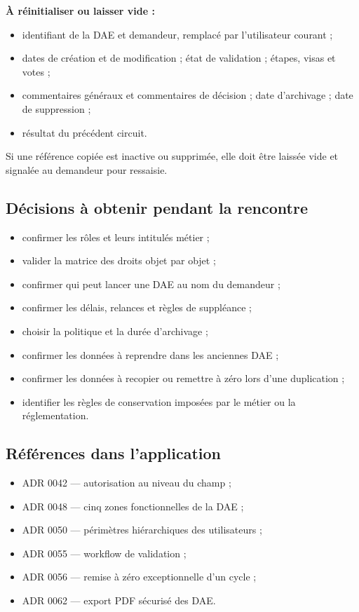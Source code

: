 \textbf{À réinitialiser ou laisser vide :}

\begin{itemize}
  \item identifiant de la DAE et demandeur, remplacé par l'utilisateur courant ;
  \item dates de création et de modification ; état de validation ; étapes, visas et votes ;
  \item commentaires généraux et commentaires de décision ; date d'archivage ; date de suppression ;
  \item résultat du précédent circuit.
\end{itemize}

Si une référence copiée est inactive ou supprimée, elle doit être laissée vide et signalée au demandeur pour ressaisie.

\subsection{Décisions à obtenir pendant la rencontre}

\begin{itemize}
  \item confirmer les rôles et leurs intitulés métier ;
  \item valider la matrice des droits objet par objet ;
  \item confirmer qui peut lancer une DAE au nom du demandeur ;
  \item confirmer les délais, relances et règles de suppléance ;
  \item choisir la politique et la durée d'archivage ;
  \item confirmer les données à reprendre dans les anciennes DAE ;
  \item confirmer les données à recopier ou remettre à zéro lors d'une duplication ;
  \item identifier les règles de conservation imposées par le métier ou la réglementation.
\end{itemize}

\subsection{Références dans l'application}

\begin{itemize}
  \item ADR 0042 — autorisation au niveau du champ ;
  \item ADR 0048 — cinq zones fonctionnelles de la DAE ;
  \item ADR 0050 — périmètres hiérarchiques des utilisateurs ;
  \item ADR 0055 — workflow de validation ;
  \item ADR 0056 — remise à zéro exceptionnelle d'un cycle ;
  \item ADR 0062 — export PDF sécurisé des DAE.
\end{itemize}
